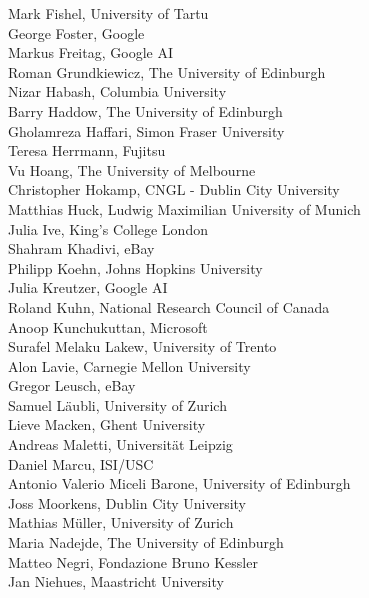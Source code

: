\documentclass[a4paper,11pt,twoside]{book}
\begin{document}
\noindent Mark Fishel, University of Tartu\\
\noindent George Foster, Google\\
\noindent Markus Freitag, Google AI\\
\noindent Roman Grundkiewicz, The University of Edinburgh\\
\noindent Nizar Habash, Columbia University\\
\noindent Barry Haddow, The University of Edinburgh\\
\noindent Gholamreza Haffari, Simon Fraser University\\
\noindent Teresa Herrmann, Fujitsu\\
\noindent Vu Hoang, The University of Melbourne\\
\noindent Christopher Hokamp, CNGL - Dublin City University\\
\noindent Matthias Huck, Ludwig Maximilian University of Munich\\
\noindent Julia Ive, King’s College London\\
\noindent Shahram Khadivi, eBay\\
\noindent Philipp Koehn, Johns Hopkins University\\
\noindent Julia Kreutzer, Google AI\\
\noindent Roland Kuhn, National Research Council of Canada\\
\noindent Anoop Kunchukuttan, Microsoft\\
\noindent Surafel Melaku Lakew, University of Trento\\
\noindent Alon Lavie, Carnegie Mellon University\\
\noindent Gregor Leusch, eBay\\
\noindent Samuel Läubli, University of Zurich\\
\noindent Lieve Macken, Ghent University\\
\noindent Andreas Maletti, Universität Leipzig\\
\noindent Daniel Marcu, ISI/USC\\
\noindent Antonio Valerio Miceli Barone, University of Edinburgh\\
\noindent Joss Moorkens, Dublin City University\\
\noindent Mathias Müller, University of Zurich\\
\noindent Maria Nadejde, The University of Edinburgh\\
\noindent Matteo Negri, Fondazione Bruno Kessler\\
\noindent Jan Niehues, Maastricht University\\
\end{document}
